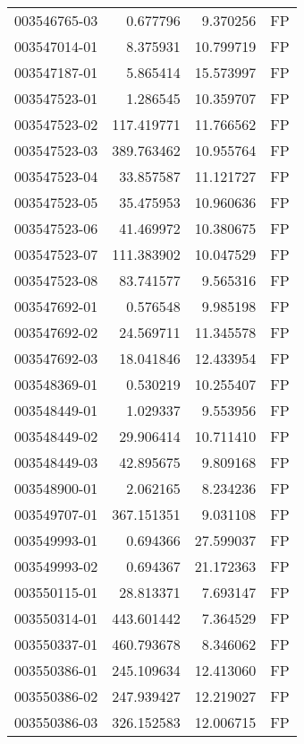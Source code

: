 \begin{tabular}{lrrl}
003546765-03 &    0.677796 &       9.370256 &   FP \\
003547014-01 &    8.375931 &      10.799719 &   FP \\
003547187-01 &    5.865414 &      15.573997 &   FP \\
003547523-01 &    1.286545 &      10.359707 &   FP \\
003547523-02 &  117.419771 &      11.766562 &   FP \\
003547523-03 &  389.763462 &      10.955764 &   FP \\
003547523-04 &   33.857587 &      11.121727 &   FP \\
003547523-05 &   35.475953 &      10.960636 &   FP \\
003547523-06 &   41.469972 &      10.380675 &   FP \\
003547523-07 &  111.383902 &      10.047529 &   FP \\
003547523-08 &   83.741577 &       9.565316 &   FP \\
003547692-01 &    0.576548 &       9.985198 &   FP \\
003547692-02 &   24.569711 &      11.345578 &   FP \\
003547692-03 &   18.041846 &      12.433954 &   FP \\
003548369-01 &    0.530219 &      10.255407 &   FP \\
003548449-01 &    1.029337 &       9.553956 &   FP \\
003548449-02 &   29.906414 &      10.711410 &   FP \\
003548449-03 &   42.895675 &       9.809168 &   FP \\
003548900-01 &    2.062165 &       8.234236 &   FP \\
003549707-01 &  367.151351 &       9.031108 &   FP \\
003549993-01 &    0.694366 &      27.599037 &   FP \\
003549993-02 &    0.694367 &      21.172363 &   FP \\
003550115-01 &   28.813371 &       7.693147 &   FP \\
003550314-01 &  443.601442 &       7.364529 &   FP \\
003550337-01 &  460.793678 &       8.346062 &   FP \\
003550386-01 &  245.109634 &      12.413060 &   FP \\
003550386-02 &  247.939427 &      12.219027 &   FP \\
003550386-03 &  326.152583 &      12.006715 &   FP \\

\end{tabular}
